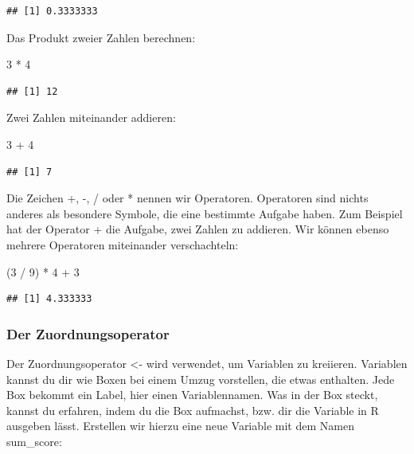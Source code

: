 \documentclass[
]{book}
\newenvironment{Shaded}{\begin{snugshade}}{\end{snugshade}}
\newcommand{\DecValTok}[1]{\textcolor[rgb]{0.00,0.00,0.81}{#1}}
\newcommand{\NormalTok}[1]{#1}
\newcommand{\SpecialCharTok}[1]{\textcolor[rgb]{0.00,0.00,0.00}{#1}}
\begin{document}
\begin{verbatim}
## [1] 0.3333333
\end{verbatim}

Das Produkt zweier Zahlen berechnen:

\begin{Shaded}
\begin{Highlighting}[]
\DecValTok{3} \SpecialCharTok{*} \DecValTok{4}
\end{Highlighting}
\end{Shaded}

\begin{verbatim}
## [1] 12
\end{verbatim}

Zwei Zahlen miteinander addieren:

\begin{Shaded}
\begin{Highlighting}[]
\DecValTok{3} \SpecialCharTok{+} \DecValTok{4} 
\end{Highlighting}
\end{Shaded}

\begin{verbatim}
## [1] 7
\end{verbatim}

Die Zeichen +, -, / oder * nennen wir Operatoren. Operatoren sind nichts anderes als besondere Symbole, die eine bestimmte Aufgabe haben. Zum Beispiel hat der Operator + die Aufgabe, zwei Zahlen zu addieren. Wir können ebenso mehrere Operatoren miteinander verschachteln:

\begin{Shaded}
\begin{Highlighting}[]
\NormalTok{(}\DecValTok{3} \SpecialCharTok{/} \DecValTok{9}\NormalTok{) }\SpecialCharTok{*} \DecValTok{4} \SpecialCharTok{+} \DecValTok{3}
\end{Highlighting}
\end{Shaded}

\begin{verbatim}
## [1] 4.333333
\end{verbatim}

\hypertarget{der-zuordnungsoperator}{%
\subsubsection{Der Zuordnungsoperator}\label{der-zuordnungsoperator}}

Der Zuordnungsoperator \textless- wird verwendet, um Variablen zu kreiieren. Variablen kannst du dir wie Boxen bei einem Umzug vorstellen, die etwas enthalten. Jede Box bekommt ein Label, hier einen Variablennamen. Was in der Box steckt, kannst du erfahren, indem du die Box aufmachst, bzw. dir die Variable in R ausgeben lässt. Erstellen wir hierzu eine neue Variable mit dem Namen sum\_score:
\end{document}
